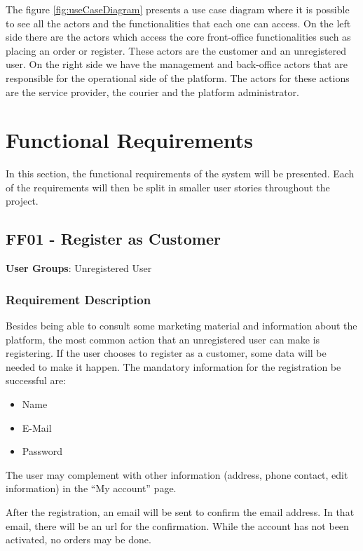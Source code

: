 \par
The figure \ref{fig:useCaseDiagram} presents a use case diagram where it is possible to see all the actors and the functionalities that each one can access. On the left side there are the actors which access the core front-office functionalities such as placing an order or register. These actors are the customer and an unregistered user. On the right side we have the management and back-office actors that are responsible for the operational side of the platform. The actors for these actions are the service provider, the courier and the platform administrator.

\section{Functional Requirements}
\label{sec:functional-requirements}
In this section, the functional requirements of the system will be presented. Each of the requirements will then be split in smaller user stories throughout the project.

\subsection{FF01 - Register as Customer}
\textbf{User Groups}: Unregistered User

\subsubsection{Requirement Description}
Besides being able to consult some marketing material and information about the platform, the most common action that an unregistered user can make is registering. If the user chooses to register as a customer, some data will be needed to make it happen. The mandatory information for the registration be successful are: 
\begin{itemize}
    \item Name
    \item E-Mail
    \item Password
\end{itemize}

The user may complement with other information (address, phone contact, edit information) in the “My account” page.
\par
After the registration, an email will be sent to confirm the email address. In that email, there will be an url for the confirmation. While the account has not been activated, no orders may be done.


